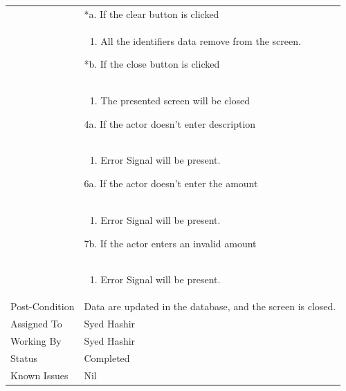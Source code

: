 \documentclass[12pt,a4paper]{article}
\begin{document}
\begin{longtable}{| p{3cm}|p{12cm}|}
& *a. If the clear button is clicked \\
& \begin{enumerate}
		\item All the identifiers data remove from the screen.
	\end{enumerate}
*b. If the close button is clicked\\
&	\begin{enumerate}
		\item The presented screen will be closed
	\end{enumerate}
4a. If the actor doesn't enter description \\ 	
&	\begin{enumerate}
		\item Error Signal will be present.
	\end{enumerate}
6a. If the actor doesn't enter the amount\\ 	
&	\begin{enumerate}
		\item Error Signal will be present.
	\end{enumerate}
7b. If the actor enters an invalid amount\\ 	
&	\begin{enumerate}
		\item Error Signal will be present.
	\end{enumerate}
\\ \hline
Post-Condition & Data are updated in the database, and the screen is closed.  \\\hline
Assigned To &  Syed Hashir
\\ \hline
Working By &   Syed Hashir
\\ \hline
Status & 	Completed	
\\ \hline
Known Issues & Nil
\\\hline
\end{longtable}

\end{document}
